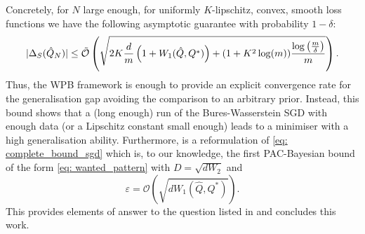 Concretely, for $N$ large enough, for uniformly $K$-lipschitz, convex, smooth loss functions we have the following asymptotic guarantee with probability $1-\delta$:
\begin{align*}
|\Delta_S(\hat{Q}_N)|  \leq\Tilde{\mathcal{O}}\left( \sqrt{2K\frac{d}{m}\left(1 + W_1(\hat{Q},Q^*)\right)+ (1+K^2\log(m)) \frac{\log\left( \frac{m}{\delta} \right)}{m}} \right).
\end{align*}
Thus, the WPB framework is enough to provide an explicit convergence rate for the generalisation gap avoiding the comparison to an arbitrary prior. Instead, this bound shows that a (long enough) run of the Bures-Wasserstein SGD with enough data (or a Lipschitz constant small enough) leads to a minimiser with a high generalisation ability. Furthermore,  is a reformulation of \eqref{eq: complete_bound_sgd} which is, to our knowledge, the first PAC-Bayesian bound of the form \eqref{eq: wanted_pattern} with $D=\sqrt{d W_2}$ and $$\varepsilon= \mathcal{O}(\sqrt{dW_1(\hat{Q},Q^*)}).$$
This provides elements of answer to the question listed in  and concludes this work.


